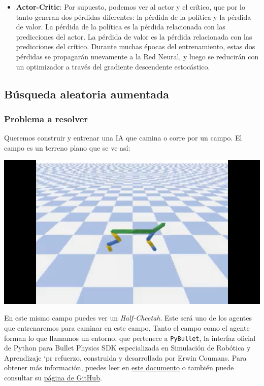\documentclass[
]{book}
\providecommand{\tightlist}{%
  \setlength{\itemsep}{0pt}\setlength{\parskip}{0pt}}
\begin{document}
\begin{itemize}
\tightlist
\item
  \textbf{Actor-Critic}: Por supuesto, podemos ver al actor y el crítico, que por lo tanto generan dos pérdidas diferentes: la pérdida de la política y la pérdida de valor. La pérdida de la política es la pérdida relacionada con las predicciones del actor. La pérdida de valor es la pérdida relacionada con las predicciones del crítico. Durante muchas épocas del entrenamiento, estas dos pérdidas se propagarán nuevamente a la Red Neural, y luego se reducirán con un optimizador a través del gradiente descendente estocástico.
\end{itemize}

\hypertarget{buxfasqueda-aleatoria-aumentada}{%
\subsection{Búsqueda aleatoria aumentada}\label{buxfasqueda-aleatoria-aumentada}}

\hypertarget{problema-a-resolver-2}{%
\subsubsection{Problema a resolver}\label{problema-a-resolver-2}}

Queremos construir y entrenar una IA que camina o corre por un campo. El campo es un terreno plano que se ve así:

\includegraphics{Images/Half_Cheetah.png}

En este mismo campo puedes ver un \emph{Half-Cheetah}. Este será uno de los agentes que entrenaremos para caminar en este campo. Tanto el campo como el agente forman lo que llamamos un entorno, que pertenece a \texttt{PyBullet}, la interfaz oficial de Python para Bullet Physics SDK especializada en Simulación de Robótica y Aprendizaje `pr refuerzo, construida y desarrollada por Erwin Coumans. Para obtener más información, puedes leer en \href{https://docs.google.com/document/d/10sXEhzFRSnvFcl3XxNGhnD4N2SedqwdAvK3dsihxVUA/edit}{este documento} o también puede consultar su \href{https://github.com/bulletphysics/bullet3}{página de GitHub}.
\end{document}
